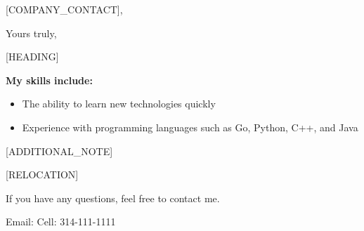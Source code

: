 

\date{\today}
\opening{[COMPANY_CONTACT],}
\closing{Yours truly,}
\makelettertitle

\setlength{\parindent}{0pt}
\newcommand{\forceindent}{\leavevmode{\parindent=0.6cm\indent}}

[HEADING] \newline

\textbf{My skills include:}
\begin{itemize}
  [ADDITIONAL_SKILL_1]
  [ADDITIONAL_SKILL_2]
  \item The ability to learn new technologies quickly
  \item Experience with programming languages such as Go, Python, C++, and Java
\end{itemize}

[ADDITIONAL_NOTE]

[RELOCATION]

If you have any questions, feel free to contact me.

Email:  \newline
Cell: 314-111-1111

\makeletterclosing
